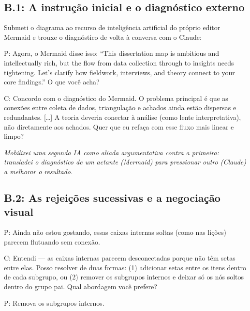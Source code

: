 \subsection*{B.1: A instrução inicial e o diagnóstico externo}

Submeti o diagrama ao recurso de inteligência artificial do próprio editor Mermaid e trouxe o diagnóstico de volta à conversa com o Claude:

\begin{faladaP}
P: Agora, o Mermaid disse isso: ``This dissertation map is ambitious and intellectually rich, but the flow from data collection through to insights needs tightening. Let's clarify how fieldwork, interviews, and theory connect to your core findings.'' O que você acha?
\end{faladaP}

\begin{faladaC}
C: Concordo com o diagnóstico do Mermaid. O problema principal é que as conexões entre coleta de dados, triangulação e achados ainda estão dispersas e redundantes. [\ldots] A teoria deveria conectar à análise (como lente interpretativa), não diretamente aos achados. Quer que eu refaça com esse fluxo mais linear e limpo?
\end{faladaC}

\noindent\emph{Mobilizei uma segunda IA como aliada argumentativa contra a primeira: transladei o diagnóstico de um actante (Mermaid) para pressionar outro (Claude) a melhorar o resultado.}

\bigskip

\subsection*{B.2: As rejeições sucessivas e a negociação visual}

\begin{faladaP}
P: Ainda não estou gostando, essas caixas internas soltas (como nas lições) parecem flutuando sem conexão.
\end{faladaP}

\begin{faladaC}
C: Entendi --- as caixas internas parecem desconectadas porque não têm setas entre elas. Posso resolver de duas formas: (1) adicionar setas entre os itens dentro de cada subgrupo, ou (2) remover os subgrupos internos e deixar só os nós soltos dentro do grupo pai. Qual abordagem você prefere?
\end{faladaC}

\begin{faladaP}
P: Remova os subgrupos internos.
\end{faladaP}

